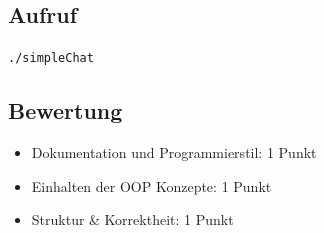 \documentclass[a4paper,10pt]{article}
\begin{document}
\subsection*{Aufruf}
\texttt{./simpleChat}

\subsection*{Bewertung}
\begin{itemize}
 \item Dokumentation und Programmierstil: 1 Punkt
 \item Einhalten der OOP Konzepte: 1 Punkt
 \item Struktur \& Korrektheit: 1 Punkt
\end{itemize}

\newpage
\end{document}
